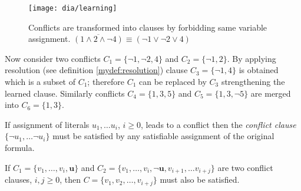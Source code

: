 \begin{figure}
  \centering
  \texttt{[image: dia/learning]}
  \caption{Conflicts are transformed into clauses by forbidding
  same variable assignment.
  $\overline{(1 \land 2 \land \neg 4)} \equiv (\neg 1 \lor \neg 2 \lor 4)$}
  \label{fig:learning}
\end{figure}

Now consider two conflicts $C_1 = \{ \neg 1, \neg 2, 4 \}$ and
$C_2 = \{ \neg 1, 2 \}$.  By applying resolution (see definition
\ref{mydef:resolution}) clause $C_3 = \{ \neg 1, 4 \}$ is obtained
which is a subset of $C_1$; therefore $C_1$ can be replaced by $C_3$
strengthening the learned clause. Similarly conflicts
$C_4 = \{ 1, 3, 5 \}$ and $C_5 = \{1, 3, \neg 5\}$ are merged
into $C_6 = \{ 1, 3 \}$.

\begin{myprop}
  If assignment of literals $u_1, \ldots u_i$, $i \ge 0$, leads to
  a conflict then the \emph{conflict clause} $\{ \neg u_1, \ldots
  \neg u_i \}$ must be satisfied by any satisfiable assignment of
  the original formula.
\end{myprop}

\begin{myprop}
  If $C_1 = \{ v_1, \ldots, v_i, \mathbf{u} \}$ and $C_2 = \{
  v_1, \ldots, v_i, \mathbf{\neg u}, v_{i+1}, \ldots v_{i+j} \}$
  are two conflict clauses, $i, j \ge 0$, then $C = \{ v_1, v_2,
  \ldots, v_{i+j} \}$ must also be satisfied.
\end{myprop}

